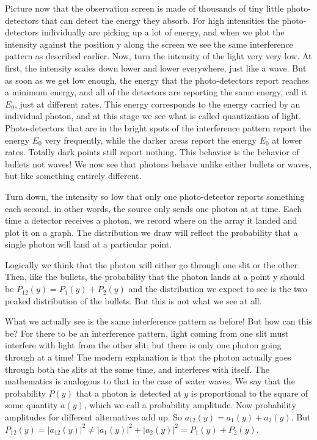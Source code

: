 Picture now that the observation screen is made of thousands of tiny little photo-detectors that can detect the energy they absorb. For high intensities the photo-detectors individually are picking up a lot of energy, and when we plot the intensity against the position y along the screen we see the same interference pattern as described earlier. Now, turn the intensity of the light very very low. At first, the intensity scales down lower and lower everywhere, just like a wave. But as soon as we get low enough, the energy that the photo-detectors report reaches a minimum energy, and all of the detectors are reporting the same energy, call it $E_0$, just at different rates. This energy corresponds to the energy carried by an individual photon, and at this stage we see what is called quantization of light. Photo-detectors that are in the bright spots of the interference pattern report the energy $E_0$ very frequently, while the darker areas report the energy $E_0$ at lower rates. Totally dark points still report nothing. This behavior is the behavior of bullets not waves! We now see that photons behave unlike either bullets or waves, but like something entirely different.

Turn down, the intensity so low that only one photo-detector reports something each second. in other words, the source only sends one photon at at time. Each time a detector receives a photon, we record where on the array it landed and plot it on a graph. The distribution we draw will reflect the probability that a single photon will land at a particular point.

Logically we think that the photon will either go through one slit or the other. Then, like the bullets, the probability that the photon lands at a point y should be $P_{12}(y)=P_1(y)+P_2(y)$ and the distribution we expect to see is the two peaked distribution of the bullets. But this is not what we see at all.

What we actually see is the same interference pattern as before! But how can this be? For there to be an interference pattern, light coming from one slit must interfere with light from the other slit; but there is only one photon going through at a time! The modern explanation is that the photon actually goes through both the slits at the same time, and interferes with itself. The mathematics is analogous to that in the case of water waves. We say that the probability $P(y)$ that a photon is detected at $y$ is proportional to the square of some quantity $a(y)$, which we call a probability amplitude. Now probability amplitudes for different alternatives add up. So $a_{12}(y)=a_{1}(y)+a_2(y)$. But $P_{12}(y)=|a_{12}(y)|^2\neq |a_1(y)|^2+|a_2(y)|^2=P_1(y)+P_2(y)$.

